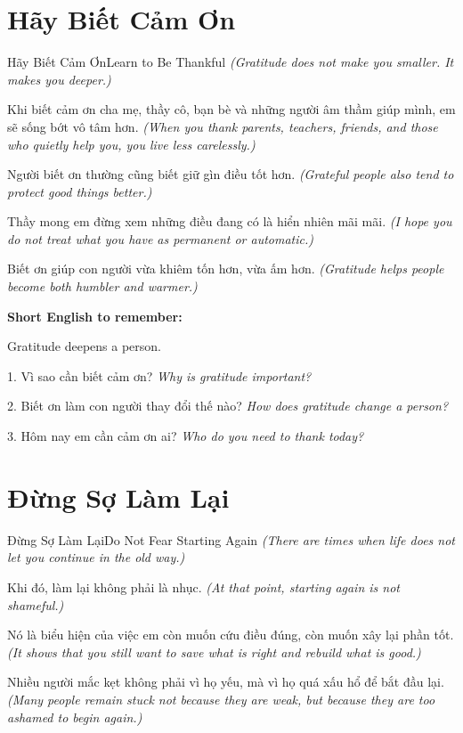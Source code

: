 \section{Hãy Biết Cảm Ơn}
\begin{truyen}{Hãy Biết Cảm Ơn}{Learn to Be Thankful}
\textit{(Gratitude does not make you smaller. It makes you deeper.)}

Khi biết cảm ơn cha mẹ, thầy cô, bạn bè và những người âm thầm giúp mình, em sẽ sống bớt vô tâm hơn.
\textit{(When you thank parents, teachers, friends, and those who quietly help you, you live less carelessly.)}

Người biết ơn thường cũng biết giữ gìn điều tốt hơn.
\textit{(Grateful people also tend to protect good things better.)}

Thầy mong em đừng xem những điều đang có là hiển nhiên mãi mãi.
\textit{(I hope you do not treat what you have as permanent or automatic.)}
\end{truyen}

\begin{baihoc}
Biết ơn giúp con người vừa khiêm tốn hơn, vừa ấm hơn.
\textit{(Gratitude helps people become both humbler and warmer.)}
\end{baihoc}

\begin{ghinhoanh}
\textbf{Short English to remember:}

Gratitude deepens a person.

\end{ghinhoanh}

\begin{tuhocnhanh}
1. Vì sao cần biết cảm ơn? \textit{Why is gratitude important?}

2. Biết ơn làm con người thay đổi thế nào? \textit{How does gratitude change a person?}

3. Hôm nay em cần cảm ơn ai? \textit{Who do you need to thank today?}
\end{tuhocnhanh}
\ngancach

\section{Đừng Sợ Làm Lại}
\begin{truyen}{Đừng Sợ Làm Lại}{Do Not Fear Starting Again}
\textit{(There are times when life does not let you continue in the old way.)}

Khi đó, làm lại không phải là nhục.
\textit{(At that point, starting again is not shameful.)}

Nó là biểu hiện của việc em còn muốn cứu điều đúng, còn muốn xây lại phần tốt.
\textit{(It shows that you still want to save what is right and rebuild what is good.)}

Nhiều người mắc kẹt không phải vì họ yếu, mà vì họ quá xấu hổ để bắt đầu lại.
\textit{(Many people remain stuck not because they are weak, but because they are too ashamed to begin again.)}
\end{truyen}

